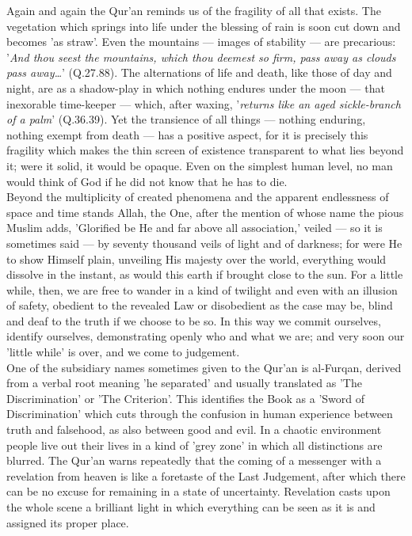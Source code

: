 \documentclass[10pt, twoside,openright]{book}
\begin{document}
Again and again the Qur'an reminds us of the fragility of all that exists. The vegetation which 
springs into life under the blessing of rain is soon cut down and becomes 'as straw'. Even the 
mountains --- images of stability --- are precarious: '\emph{And thou seest the mountains, which thou deemest so firm, pass away as clouds pass away\ldots{}}' (Q.27.88). The alternations of life and death, like those of day and night, are as a shadow\hyp{}play in which nothing endures under the moon --- that inexorable time-keeper --- which, after waxing, '\emph{returns like an aged sickle\hyp{}branch of a palm}' (Q.36.39). Yet the transience of all things --- nothing enduring, nothing exempt from death --- has a positive aspect, for it is precisely this fragility which makes the thin screen of existence transparent to what lies beyond it; were it solid, it would be opaque. Even on the simplest human level, no man would think of God if he did not know that he has to die. \\

Beyond the multiplicity of created phenomena and the apparent endlessness of space and time stands 
Allah, the One, after the mention of whose name the pious Muslim adds, 'Glorified be He and far above 
all association,' veiled --- so it is sometimes said --- by seventy thousand veils of light and of 
darkness; for were He to show Himself plain, unveiling His majesty over the world, everything would 
dissolve in the instant, as would this earth if brought close to the sun. For a little while, then, 
we are free to wander in a kind of twilight and even with an illusion of safety, obedient to the 
revealed Law or disobedient as the case may be, blind and deaf to the truth if we choose to be so. In 
this way we commit ourselves, identify ourselves, demonstrating openly who and what we are; and very 
soon our 'little while' is over, and we come to judgement. \\

One of the subsidiary names sometimes given to the Qur'an is al\hyp{}Furqan, derived from a verbal root 
meaning 'he separated' and usually translated as 'The Discrimination' or 'The Criterion'. This 
identifies the Book as a 'Sword of Discrimination' which cuts through the confusion in human 
experience between truth and falsehood, as also between good and evil. In a chaotic environment 
people live out their lives in a kind of 'grey zone' in which all distinctions are blurred. The 
Qur'an warns repeatedly that the coming of a messenger with a revelation from heaven is like a 
foretaste of the Last Judgement, after which there can be no excuse for remaining in a state of 
uncertainty. Revelation casts upon the whole scene a brilliant light in which everything can be seen 
as it is and assigned its proper place. \\
\end{document}
